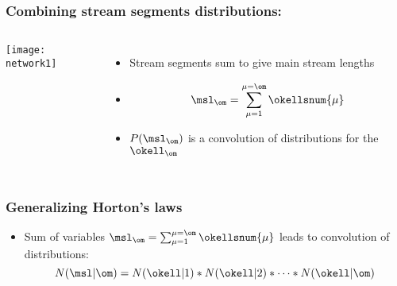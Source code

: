 \begin{frame}[label=]
  \frametitle{Combining stream segments distributions:}

  \begin{columns}
    \texttt{[image: network1]}
    \begin{itemize}
    \item<1-> Stream segments sum to give main stream lengths
    \item<1-> $$ \msl_\om = \sum_{\mu=1}^{\mu=\om} \okellsnum{\mu} $$
    \item<2-> $P(\msl_\om)$ is a convolution of distributions
      for the $\okell_\om$
    \end{itemize}
    
  \end{columns}

\end{frame}



\begin{frame}[label=]
  \frametitle{Generalizing Horton's laws}

  \begin{itemize}
  \item<1-> Sum of variables 
  $ \msl_\om = \sum_{\mu=1}^{\mu=\om} \okellsnum{\mu} $
  leads to convolution of distributions:
  $$N(\msl|\om) = N(\okell|1) \ast N(\okell|2) \ast\cdots\ast N(\okell|\om)$$
  \end{itemize}

\end{frame}


